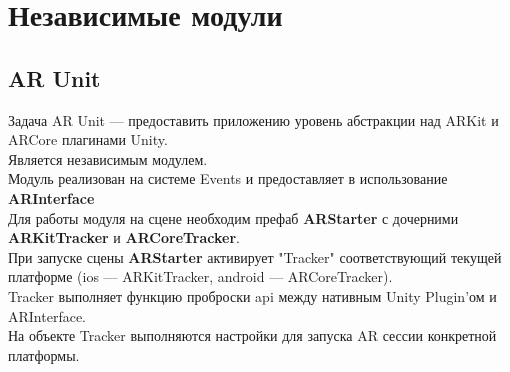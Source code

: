 \documentclass[a4paper, 11pt, titlepage]{article}
\begin{document}
  \section{Независимые модули}
    \subsection{AR Unit}
      Задача AR Unit --- предоставить приложению уровень абстракции над ARKit и ARCore плагинами Unity. \\
      Является независимым модулем. \\
      Модуль реализован на системе Events и предоставляет в использование \textbf{ARInterface} \\
      Для работы модуля на сцене необходим префаб \textbf{ARStarter} с дочерними \textbf{ARKitTracker} и 
      \textbf{ARCoreTracker}. \\
      При запуске сцены \textbf{ARStarter} активирует "Tracker" соответствующий текущей платформе (ios --- ARKitTracker, android --- ARCoreTracker).\\
      Tracker выполняет функцию проброски api между нативным Unity Plugin'ом и ARInterface. \\
      На объекте Tracker выполняются настройки для запуска AR сессии конкретной платформы.

      \begin{center}
      \end{center}
\end{document}
